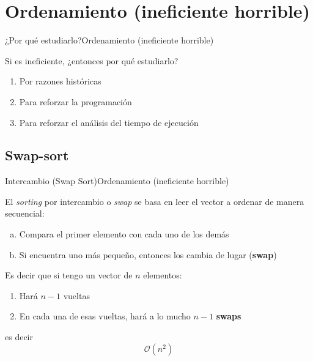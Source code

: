 \documentclass[spanish, c]{beamer}
\newcommand{\bigO}{\mathcal{O}}
\begin{document}
\section{Ordenamiento (ineficiente horrible)}

\begin{frame}{¿Por qué estudiarlo?}{Ordenamiento (ineficiente horrible)}

    Si es ineficiente, ¿entonces por qué estudiarlo? \pause

    \bigskip

    \begin{enumerate}[1)]
        \itemsep3.5ex
        \item Por razones históricas \pause
        \item Para reforzar la programación \pause
        \item Para reforzar el análisis del tiempo de ejecución
    \end{enumerate}
\end{frame}

\subsection{Swap-sort}

\begin{frame}{Intercambio (Swap Sort)}{Ordenamiento (ineficiente horrible)}

    El \textit{sorting} por \alert{intercambio} o \textit{swap} se basa en leer el vector a ordenar de manera secuencial:

    \begin{enumerate}[a)]
        \item Compara el primer elemento con cada uno de los demás \pause
        \item Si encuentra uno más pequeño, entonces los cambia de lugar (\textbf{swap}) \pause
    \end{enumerate}

    \bigskip

    Es decir que si tengo un vector de $n$ elementos: \pause

    \begin{enumerate}[1.]
        \item Hará $n-1$ vueltas \pause
        \item En cada una de esas vueltas, hará a lo mucho $n-1$ \textbf{swaps} \pause
    \end{enumerate}

    \bigskip

    es decir
    {\Large $$\bigO(n^2)$$}
\end{frame}
\end{document}
